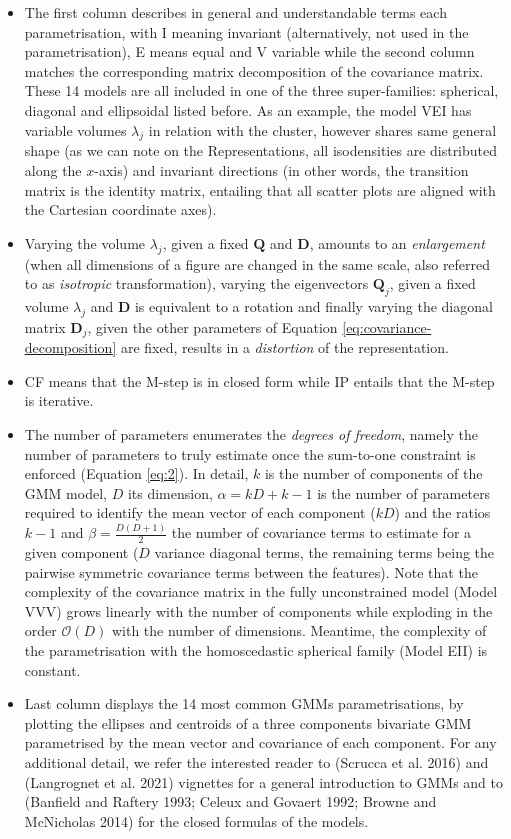 \begin{itemize}
\item
  The first column describes in general and understandable terms each parametrisation, with I meaning invariant (alternatively, not used in the parametrisation), E means equal and V variable while the second column matches the corresponding matrix decomposition of the covariance matrix. These 14 models are all included in one of the three super-families: spherical, diagonal and ellipsoidal listed before. As an example, the model VEI has variable volumes \(\lambda_j\) in relation with the cluster, however shares same general shape (as we can note on the Representations, all isodensities are distributed along the \(x\)-axis) and invariant directions (in other words, the transition matrix is the identity matrix, entailing that all scatter plots are aligned with the Cartesian coordinate axes).
\item
  Varying the volume \(\lambda_j\), given a fixed \(\boldsymbol{Q}\) and \(\boldsymbol{D}\), amounts to an \emph{enlargement} (when all dimensions of a figure are changed in the same scale, also referred to as \emph{isotropic} transformation), varying the eigenvectors \(\boldsymbol{Q}_j\), given a fixed volume \(\lambda_j\) and \(\boldsymbol{D}\) is equivalent to a rotation and finally varying the diagonal matrix \(\boldsymbol{D}_j\), given the other parameters of Equation \eqref{eq:covariance-decomposition} are fixed, results in a \emph{distortion} of the representation.
\item
  CF means that the M-step is in closed form while IP entails that the M-step is iterative.
\item
  The number of parameters enumerates the \emph{degrees of freedom}, namely the number of parameters to truly estimate once the sum-to-one constraint is enforced (Equation \eqref{eq:2}). In detail, \(k\) is the number of components of the GMM model, \(D\) its dimension, \(\alpha=kD + k - 1\) is the number of parameters required to identify the mean vector of each component (\(kD\)) and the ratios \(k-1\) and \(\beta=\frac{D(D+1)}{2}\) the number of covariance terms to estimate for a given component (\(D\) variance diagonal terms, the remaining terms being the pairwise symmetric covariance terms between the features). Note that the complexity of the covariance matrix in the fully unconstrained model (Model VVV) grows linearly with the number of components while exploding in the order \(\mathcal{O}(D)\) with the number of dimensions. Meantime, the complexity of the parametrisation with the homoscedastic spherical family (Model EII) is constant.
\item
  Last column displays the 14 most common GMMs parametrisations, by plotting the ellipses and centroids of a three components bivariate GMM parametrised by the mean vector and covariance of each component. For any additional detail, we refer the interested reader to  (Scrucca et al. 2016) and  (Langrognet et al. 2021) vignettes for a general introduction to GMMs and to (Banfield and Raftery 1993; Celeux and Govaert 1992; Browne and McNicholas 2014) for the closed formulas of the models.
\end{itemize}

